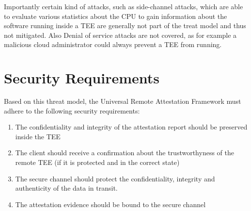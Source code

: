 Importantly certain kind of attacks, such as side-channel attacks, which are able to evaluate various statistics about the CPU to gain information about the software running inside a TEE are generally not part of the treat model and thus not mitigated. Also Denial of service attacks are not covered, as for example a malicious cloud administrator could always prevent a TEE from running.  \cite{overview_of_sgx}

\section{Security Requirements}
Based on this threat model, the Universal Remote Attestation Framework must adhere to the following security requirements:

\begin{enumerate}
	\item The confidentiality and integrity of the attestation report should be preserved inside the TEE
	\item The client should receive a confirmation about the trustworthyness of the remote TEE (if it is protected and in the correct state) 
	\item The secure channel should protect the confidentiality, integrity and authenticity of the data in transit.
	\item The attestation evidence should be bound to the secure channel 
\end{enumerate}		
